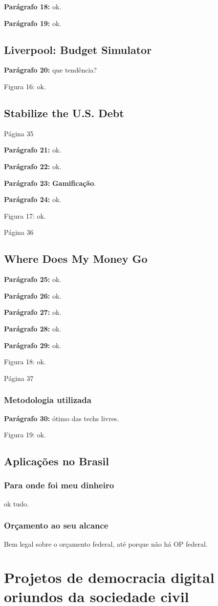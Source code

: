 \documentclass[12pt]{report}
\newcommand{\pp}[1]{

\textbf{Parágrafo #1:}
}
\begin{document}
\pp{18} ok.

\pp{19} ok.

\subsection{Liverpool: Budget Simulator}

\pp{20} que tendência?

Figura 16: ok.

\subsection{Stabilize the U.S. Debt}
\noindent Página 35
\pp{21} ok.
\pp{22} ok.
\pp{23} {\bf \color{red} Gamificação}.
\pp{24} ok.

Figura 17: ok.

\noindent Página 36

\subsection{Where Does My Money Go}
\pp{25} ok.
\pp{26} ok.
\pp{27} ok.
\pp{28} ok.
\pp{29} ok.

Figura 18: ok.

\noindent Página 37

\subsubsection{Metodologia utilizada}
\pp{30} ótimo das techs livres.

Figura 19: ok.

\subsection{Aplicações no Brasil}
\subsubsection{Para onde foi meu dinheiro}
ok tudo.
\subsubsection{Orçamento ao seu alcance}
Bem legal sobre o orçamento federal, até porque não há OP federal.

\section{Projetos de democracia digital oriundos da sociedade civil}
\end{document}
